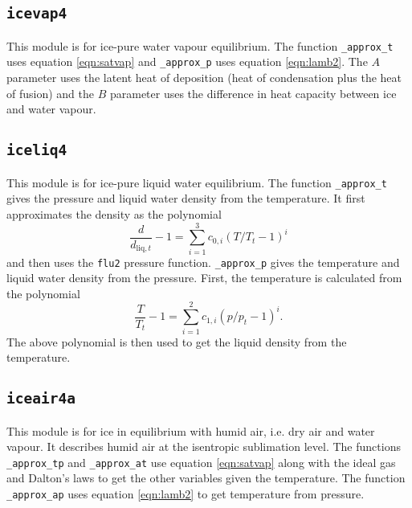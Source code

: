 \documentclass{article}
\newcommand{\liq}{\text{liq}}
\begin{document}
\subsection{\texttt{icevap4}}

This module is for ice-pure water vapour equilibrium. The function \texttt{\_approx\_t} uses equation \ref{eqn:satvap} and \texttt{\_approx\_p} uses equation \ref{eqn:lamb2}. The $A$ parameter uses the latent heat of deposition (heat of condensation plus the heat of fusion) and the $B$ parameter uses the difference in heat capacity between ice and water vapour.


\subsection{\texttt{iceliq4}}

This module is for ice-pure liquid water equilibrium. The function \texttt{\_approx\_t} gives the pressure and liquid water density from the temperature. It first approximates the density as the polynomial
\begin{equation*}
    \frac{d}{d_{\liq,t}} - 1 = \sum_{i=1}^3 c_{0,i} (T/T_t-1)^i
\end{equation*}
and then uses the \texttt{flu2} pressure function. \texttt{\_approx\_p} gives the temperature and liquid water density from the pressure. First, the temperature is calculated from the polynomial
\begin{equation*}
    \frac{T}{T_t} - 1 = \sum_{i=1}^2 c_{1,i} (p/p_t-1)^i.
\end{equation*}
The above polynomial is then used to get the liquid density from the temperature.


\subsection{\texttt{iceair4a}}

This module is for ice in equilibrium with humid air, i.e. dry air and water vapour. It describes humid air at the isentropic sublimation level. The functions \texttt{\_approx\_tp} and \texttt{\_approx\_at} use equation \ref{eqn:satvap} along with the ideal gas and Dalton's laws to get the other variables given the temperature. The function \texttt{\_approx\_ap} uses equation \ref{eqn:lamb2} to get temperature from pressure.
\end{document}
